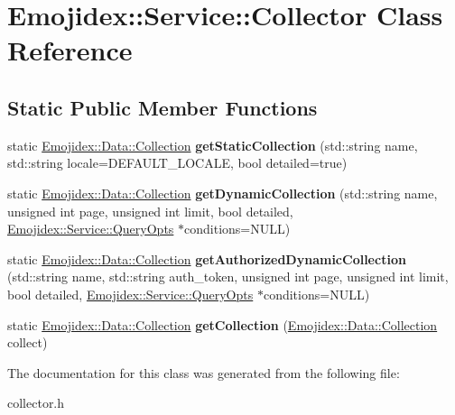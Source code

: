 \hypertarget{classEmojidex_1_1Service_1_1Collector}{}\section{Emojidex\+:\+:Service\+:\+:Collector Class Reference}
\label{classEmojidex_1_1Service_1_1Collector}
\subsection*{Static Public Member Functions}
\begin{DoxyCompactItemize}
\item 
static \hyperlink{classEmojidex_1_1Data_1_1Collection}{Emojidex\+::\+Data\+::\+Collection} {\bfseries get\+Static\+Collection} (std\+::string name, std\+::string locale=D\+E\+F\+A\+U\+L\+T\+\_\+\+L\+O\+C\+A\+LE, bool detailed=true)\hypertarget{classEmojidex_1_1Service_1_1Collector_a51ed2454051cff8ee1b76dfe0ebd0e3c}{}\label{classEmojidex_1_1Service_1_1Collector_a51ed2454051cff8ee1b76dfe0ebd0e3c}

\item 
static \hyperlink{classEmojidex_1_1Data_1_1Collection}{Emojidex\+::\+Data\+::\+Collection} {\bfseries get\+Dynamic\+Collection} (std\+::string name, unsigned int page, unsigned int limit, bool detailed, \hyperlink{classEmojidex_1_1Service_1_1QueryOpts}{Emojidex\+::\+Service\+::\+Query\+Opts} $\ast$conditions=N\+U\+LL)\hypertarget{classEmojidex_1_1Service_1_1Collector_a3d576269475065aef15391dd597dfd5a}{}\label{classEmojidex_1_1Service_1_1Collector_a3d576269475065aef15391dd597dfd5a}

\item 
static \hyperlink{classEmojidex_1_1Data_1_1Collection}{Emojidex\+::\+Data\+::\+Collection} {\bfseries get\+Authorized\+Dynamic\+Collection} (std\+::string name, std\+::string auth\+\_\+token, unsigned int page, unsigned int limit, bool detailed, \hyperlink{classEmojidex_1_1Service_1_1QueryOpts}{Emojidex\+::\+Service\+::\+Query\+Opts} $\ast$conditions=N\+U\+LL)\hypertarget{classEmojidex_1_1Service_1_1Collector_a4d3839fcce3e4191b3076c64bab9a925}{}\label{classEmojidex_1_1Service_1_1Collector_a4d3839fcce3e4191b3076c64bab9a925}

\item 
static \hyperlink{classEmojidex_1_1Data_1_1Collection}{Emojidex\+::\+Data\+::\+Collection} {\bfseries get\+Collection} (\hyperlink{classEmojidex_1_1Data_1_1Collection}{Emojidex\+::\+Data\+::\+Collection} collect)\hypertarget{classEmojidex_1_1Service_1_1Collector_afeb2efb1c30de239a89f360eba795818}{}\label{classEmojidex_1_1Service_1_1Collector_afeb2efb1c30de239a89f360eba795818}

\end{DoxyCompactItemize}


The documentation for this class was generated from the following file\+:\begin{DoxyCompactItemize}
\item 
collector.\+h\end{DoxyCompactItemize}
